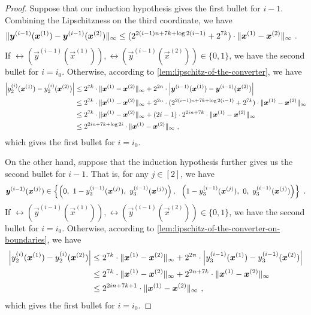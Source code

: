 \begin{proof}
    Suppose that our induction hypothesis gives the first bullet for $i-1$.
    Combining the Lipschitzness on the third coordinate, we have 
    \begin{align*}
        \| {\boldsymbol{y}^{(i-1)}(\boldsymbol{x}^{(1)})-\boldsymbol{y}^{(i-1)}(\boldsymbol{x}^{(2)})} \|_{\infty} &\leq (2^{2(i-1)n+7 k + \log 2(i-1)}+2^{7k}) \cdot \| {\boldsymbol{x}^{(1)}-\boldsymbol{x}^{(2)}} \|_{\infty}~. 
    \end{align*}
    If $\rel(\vec{y}^{(i-1)}(\vec{x}^{(1)})), \rel(\vec{y}^{(i-1)}(\vec{x}^{(2)})) \in \{0,1\}$, we have the second bullet for $i=i_0$.
    Otherwise, according to \cref{lem:lipschitz-of-the-converter}, we have 
    \begin{align*}
        \left |{y_2^{(i)}(\boldsymbol{x}^{(1)})-y_2^{(i)}(\boldsymbol{x}^{(2)})} \right | 
        &\leq 
        2^{7k}\cdot \| {\boldsymbol{x}^{(1)}-\boldsymbol{x}^{(2)}} \|_{\infty} + 2^{2n} \cdot \left |{\boldsymbol{y}^{(i-1)}(\boldsymbol{x}^{(1)}) - \boldsymbol{y}^{(i-1)}(\boldsymbol{x}^{(2)})} \right |
        \\
        &\leq
        2^{7k}\cdot \| {\boldsymbol{x}^{(1)}-\boldsymbol{x}^{(2)}} \|_{\infty} + 2^{2n}\cdot (2^{2(i-1)n+7k+\log 2(i-1)}+2^{7k}) \cdot \| {\boldsymbol{x}^{(1)}-\boldsymbol{x}^{(2)}} \|_{\infty}
        \\
        &\leq
        2^{7k}\cdot \| {\boldsymbol{x}^{(1)}-\boldsymbol{x}^{(2)}} \|_{\infty} + (2i-1)\cdot 2^{2in+7k}\cdot \| {\boldsymbol{x}^{(1)}-\boldsymbol{x}^{(2)}} \|_{\infty}
        \\
        &\leq 
        2^{2in+7k + \log 2i}\cdot \| {\boldsymbol{x}^{(1)}-\boldsymbol{x}^{(2)}} \|_{\infty} ~, 
    \end{align*}
    which gives the first bullet for $i=i_0$.

    On the other hand, suppose that the induction hypothesis further gives us the second bullet for $i-1$. 
    That is, for any $j\in [2]$, we have 
    \[
        \vec{y}^{(i-1)}(\vec{x}^{(j)}) \in \set{\left(0,\ 1-y_3^{(i-1)}(\vec{x}^{(j)}),\ y_3^{(i-1)}(\vec{x}^{(j)})\right), ~~ \left(1-y_3^{(i-1)}(\vec{x}^{(j)}),\ 0,\ y_3^{(i-1)}(\vec{x}^{(j)})\right)}~.
    \]
    If $\rel(\vec{y}^{(i-1)}(\vec{x}^{(1)})), \rel(\vec{y}^{(i-1)}(\vec{x}^{(2)})) \in \{0,1\}$, we have the second bullet for $i=i_0$.
    Otherwise, according to \cref{lem:lipschitz-of-the-converter-on-boundaries}, we have 
    \begin{align*}
        \left |{y_2^{(i)}(\boldsymbol{x}^{(1)})-y_2^{(i)}(\boldsymbol{x}^{(2)})} \right | 
        &\leq 
        2^{7k}\cdot \| {\boldsymbol{x}^{(1)}-\boldsymbol{x}^{(2)}} \|_{\infty} + 2^{2n} \cdot \left |{y_3^{(i-1)}(\boldsymbol{x}^{(1)}) - y_3^{(i-1)}(\boldsymbol{x}^{(2)})} \right |
        \\
        &\leq
        2^{7k}\cdot \| {\boldsymbol{x}^{(1)}-\boldsymbol{x}^{(2)}} \|_{\infty} + 2^{2n+7k} \cdot \| {\boldsymbol{x}^{(1)}-\boldsymbol{x}^{(2)}} \|_{\infty}
        \\
        &\leq 
        2^{2in+7k+1}\cdot \| {\boldsymbol{x}^{(1)}-\boldsymbol{x}^{(2)}} \|_{\infty} ~, 
    \end{align*}
    which gives the first bullet for $i=i_0$.
\end{proof}

